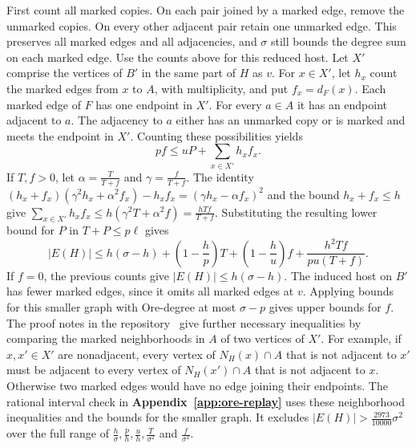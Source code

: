 \documentclass[preprint,11pt,numbers]{elsarticle-arxiv}
\numberwithin{equation}{section}
\theoremstyle{definition}
\begin{document}
First count all marked copies. On each pair joined by a marked
edge, remove the unmarked copies. On every other adjacent pair
retain one unmarked edge. This preserves all marked edges and all
adjacencies, and $\sigma$ still bounds the degree sum on each marked
edge. Use the counts above for this reduced host. Let $X'$ comprise the vertices of
$B'$ in the same part of $H$ as $v$. For $x\in X'$, let $h_x$
count the marked edges from $x$ to $A$, with multiplicity, and put
$f_x=d_F(x)$.
Each marked edge of $F$ has one endpoint in $X'$. For every
$a\in A$ it has an endpoint adjacent to $a$. The adjacency to $a$
either has an unmarked copy or is marked and meets the endpoint
in $X'$. Counting these possibilities yields
\[
 pf\leq uP+\sum_{x\in X'} h_xf_x .
\]
If $T,f>0$, let $\alpha=\frac{T}{T+f}$ and $\gamma=\frac{f}{T+f}$.
The identity
$(h_x+f_x)(\gamma^2h_x+\alpha^2 f_x)-h_x f_x
=(\gamma h_x-\alpha f_x)^2$ and the bound $h_x+f_x\leq h$
give $\sum_{x\in X'} h_xf_x\leq h(\gamma^2T+\alpha^2 f)
=\frac{hTf}{T+f}$. Substituting the resulting lower bound for
$P$ in $T+P\leq p\ell$ gives
\[
 |E(H)|\leq h(\sigma-h)+\left(1-\frac hp\right)T
       +\left(1-\frac hu\right)f
       +\frac{h^2Tf}{pu(T+f)} .
\]
If $f=0$, the previous counts give $|E(H)|\leq h(\sigma-h)$.
The induced host on $B'$ has fewer marked edges, since it omits
all marked edges at $v$. Applying bounds for this smaller graph with
Ore-degree at most $\sigma-p$ gives upper bounds for $f$.
The proof notes in the repository~\cite{FGSTCode} give further necessary
inequalities by comparing the marked neighborhoods in $A$ of
two vertices of $X'$. For example, if $x,x'\in X'$ are nonadjacent,
every vertex of $N_H(x)\cap A$ that is not adjacent to $x'$ must
be adjacent to every vertex of $N_H(x')\cap A$ that is not adjacent
to $x$. Otherwise two marked edges would have no edge joining their
endpoints. The rational interval check in \textbf{Appendix~\ref{app:ore-replay}}
uses these neighborhood inequalities and the bounds for the smaller
graph. It excludes $|E(H)|>\frac{2973}{10000}\sigma^2$ over the full
range of $\frac{h}{\sigma},\frac ph,\frac uh,\frac{T}{\sigma^2}$
and $\frac{f}{\sigma^2}$.
\end{document}
